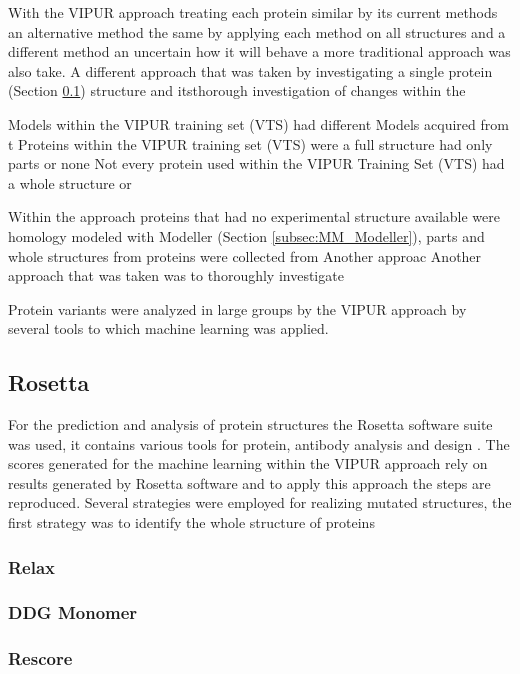 With the VIPUR approach treating each protein similar by its current methods an alternative method  the same by applying each method on all structures and   a different method an uncertain how it will behave a more traditional approach was also take.
A different approach that was taken by investigating a single protein (Section \ref{}) structure and itsthorough investigation of changes within the

Models within the VIPUR training set (VTS) had different
Models acquired from t
Proteins within the VIPUR training set (VTS) were a full structure had only parts or none
Not every protein used within the VIPUR Training Set (VTS) had a whole structure or 

Within the approach proteins that had no experimental structure available were homology modeled with Modeller (Section \ref{subsec:MM_Modeller}), parts and whole structures from proteins were collected from 
Another approac
Another approach that was taken was to thoroughly investigate 

Protein variants were analyzed in large groups by the VIPUR approach by several tools to which machine learning was applied. 

\subsection{Rosetta}
For the prediction and analysis of protein structures the Rosetta software suite was used, it contains various tools for protein, antibody analysis and design \cite{}.
The scores generated for the machine learning within the VIPUR approach rely on results generated by Rosetta software and to apply this approach the steps are reproduced.  
Several strategies were employed for realizing mutated structures, the first strategy was to identify the whole structure of proteins



\subsubsection{Relax}
\label{subsubsec:MM_Relax}

\subsubsection{DDG Monomer}
\label{subsubsec:MM_DDG_Monomer}

\subsubsection{Rescore}
\label{subsubsec:MM_Rescore}

